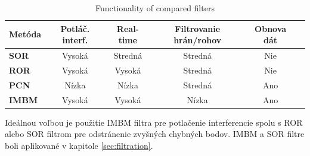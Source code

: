 \begin{table}[h]
	\caption{\label{tab:functionality} Functionality of compared filters }
	\centering
	\begin{tabular}{lccccc}
		\toprule
		\textbf{Metóda} & \textbf{Potláč. interf.} & \textbf{Real-time} & \textbf{Filtrovanie hrán/rohov} & \textbf{Obnova dát} \\ 
		\midrule
		\textbf{SOR}     & Vysoká      & Stredná    & Stredná   & Nie    \\ 
		\textbf{ROR}     & Vysoká      & Vysoká      & Stredná   & Nie    \\ 
		\textbf{PCN}     & Nízka       & Nízka       & Stredná   & Ano   	\\ 
		\textbf{IMBM}    & Vysoká      & Vysoká      & Nízka      & Ano   \\ 
		\bottomrule
	\end{tabular}
\end{table}

Ideálnou voľbou je použitie IMBM filtra pre potlačenie interferencie spolu s ROR alebo SOR filtrom pre odstránenie zvyšných chybných bodov. IMBM a SOR filtre boli aplikované v kapitole \ref{sec:filtration}. 